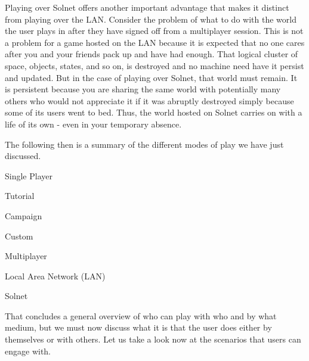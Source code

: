 Playing over Solnet offers another important advantage that makes it distinct from playing over the LAN. Consider the problem of what to do with the world the user plays in after they have signed off from a multiplayer session. This is not a problem for a game hosted on the LAN because it is expected that no one cares after you and your friends pack up and have had enough. That logical cluster of space, objects, states, and so on, is destroyed and no machine need have it persist and updated. But in the case of playing over Solnet, that world must remain. It is persistent because you are sharing the same world with potentially many others who would not appreciate it if it was abruptly destroyed simply because some of its users went to bed. Thus, the world hosted on Solnet carries on with a life of its own - even in your temporary absence.

The following then is a summary of the different modes of play we have just discussed.

\startitemize[4]
    \item Single Player
        \startitemize[4]
        \item Tutorial
        \item Campaign
        \item Custom
        \stopitemize

    \item Multiplayer
        \startitemize[4]
        \item Local Area Network (LAN)
        \item Solnet
        \stopitemize
\stopitemize

That concludes a general overview of who can play with who and by what medium, but we must now discuss what it is that the user does either by themselves or with others. Let us take a look now at the scenarios that users can engage with.


